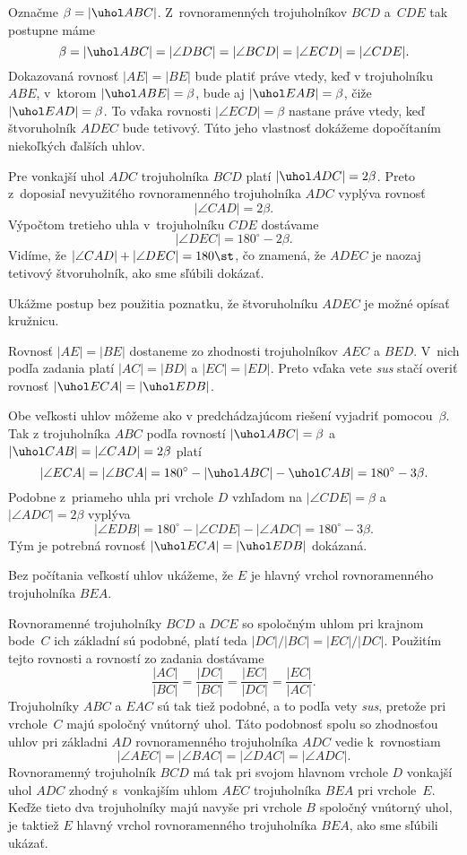 {%
Označme $\beta=|\uhol ABC|$. Z~rovnoramenných
trojuholníkov $BCD$ a~$CDE$ tak postupne máme
$$
\beta=|\uhol ABC|=|\angle DBC|=|\angle BCD|=|\angle ECD|=|\angle CDE|.
$$
Dokazovaná rovnosť $|AE|=|BE|$ bude platiť práve vtedy, keď v trojuholníku
$ABE$, v~ktorom $|\uhol ABE|=\beta$, bude aj $|\uhol EAB|=\beta$, čiže
$|\uhol EAD|=\beta$. To vďaka
rovnosti $|\angle ECD|=\beta$ nastane práve vtedy, keď
štvoruholník $ADEC$ bude tetivový. Túto jeho vlastnosť dokážeme
dopočítaním niekoľkých ďalších uhlov.

Pre vonkajší uhol $ADC$ trojuholníka $BCD$ platí $|\uhol ADC|=2\beta$.
Preto z~doposiaľ nevyužitého rovnoramenného trojuholníka $ADC$ vyplýva
rovnosť
$$
|\angle CAD|= 2\beta.
$$
Výpočtom tretieho uhla v~trojuholníku $CDE$ dostávame
$$
|\angle DEC|= 180^\circ - 2\beta.
$$
Vidíme, že $|\angle CAD|+|\angle DEC|=180\st$, čo znamená,
že $ADEC$ je naozaj tetivový štvoruholník, ako sme sľúbili dokázať.
%

\ineriesenie
Ukážme postup bez použitia poznatku, že štvoruholníku $ADEC$ je možné
opísať kružnicu.

Rovnosť $|AE|=|BE|$ dostaneme zo zhodnosti trojuholníkov $AEC$ a $BED$.
V~nich podľa zadania platí $|AC|=|BD|$ a $|EC|=|ED|$. Preto vďaka
vete \emph{sus} stačí overiť rovnosť $|\uhol ECA|=|\uhol EDB|$.

Obe veľkosti uhlov môžeme ako v predchádzajúcom riešení
vyjadriť pomocou~$\beta$. Tak z trojuholníka $ABC$
podľa rovností $|\uhol ABC|=\beta$ a $|\uhol CAB|=|\angle
CAD| = 2\beta$ platí
$$
|\angle ECA|=|\angle BCA|=180^\circ-|\uhol ABC|-\uhol CAB|
=180^\circ -3\beta.
$$
Podobne z~priameho uhla pri vrchole $D$ vzhľadom na
$|\angle CDE| = \beta$ a $|\angle ADC| = 2\beta$ vyplýva
$$
|\angle EDB|= 180^\circ - |\angle CDE|-|\angle ADC|=
180^\circ -3\beta.
$$
Tým je potrebná rovnosť $|\uhol ECA|=|\uhol EDB|$ dokázaná.

\ineriesenie
Bez počítania veľkostí uhlov ukážeme, že
$E$ je hlavný vrchol rovnoramenného trojuholníka $BEA$.

Rovnoramenné trojuholníky $BCD$ a $DCE$ so
spoločným uhlom pri krajnom bode~$C$ ich základní
sú podobné, platí teda $|DC|/|BC|=|EC|/|DC|$.
Použitím tejto rovnosti a rovností zo zadania dostávame
$$
\frac{|AC|}{|BC|}=\frac{|DC|}{|BC|}=\frac{|EC|}{|DC|}
=\frac{|EC|}{|AC|}.
$$
Trojuholníky $ABC$ a $EAC$ sú tak tiež podobné, a to
podľa vety \emph{sus}, pretože pri vrchole~$C$ majú spoločný vnútorný uhol.
Táto podobnosť spolu so zhodnosťou uhlov pri základni $AD$
rovnoramenného trojuholníka $ADC$ vedie k~rovnostiam
$$
|\angle AEC|=|\angle BAC|=|\angle DAC|=|\angle ADC|.
$$
Rovnoramenný trojuholník $BCD$ má tak pri svojom hlavnom vrchole $D$
vonkajší uhol $ADC$ zhodný s~vonkajším uhlom $AEC$ trojuholníka $BEA$
pri vrchole~$E$. Keďže tieto dva trojuholníky majú navyše pri vrchole $B$
spoločný vnútorný uhol, je taktiež $E$ hlavný vrchol
rovnoramenného trojuholníka $BEA$, ako sme sľúbili ukázať.

}
